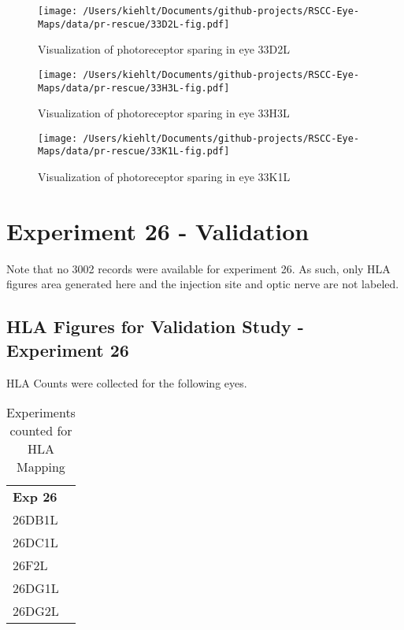\documentclass{article}
\begin{document}
\begin{center}
\begin{figure}
\texttt{[image: /Users/kiehlt/Documents/github-projects/RSCC-Eye-Maps/data/pr-rescue/33D2L-fig.pdf]}
\caption{Visualization of photoreceptor sparing in eye 33D2L}
\label{fig:33D2L}
\end{figure}

\end{center}
\begin{center}
\begin{figure}
\texttt{[image: /Users/kiehlt/Documents/github-projects/RSCC-Eye-Maps/data/pr-rescue/33H3L-fig.pdf]}
\caption{Visualization of photoreceptor sparing in eye 33H3L}
\label{fig:33H3L}
\end{figure}

\end{center}
\begin{center}
\begin{figure}
\texttt{[image: /Users/kiehlt/Documents/github-projects/RSCC-Eye-Maps/data/pr-rescue/33K1L-fig.pdf]}
\caption{Visualization of photoreceptor sparing in eye 33K1L}
\label{fig:33K1L}
\end{figure}

\end{center}\newpage

\section{Experiment 26 - Validation}
Note that no 3002 records were available for experiment 26. As such, only HLA figures area generated here and the injection site and optic nerve are not labeled.
\subsection{HLA Figures for Validation Study - Experiment 26}
HLA Counts were collected for the following eyes.
\begin{table}[]
\centering
\begin{tabular}{l}
\textbf{Exp 26} \\
26DB1L  \\
26DC1L \\
26F2L \\
26DG1L  \\
26DG2L \\
\end{tabular}
\caption{Experiments counted for HLA Mapping}
\end{table}
\end{document}
